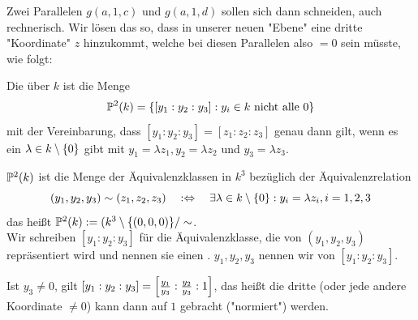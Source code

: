 Zwei Parallelen $g(a,1,c)$ und $g(a,1,d)$ sollen sich dann schneiden, auch rechnerisch. Wir lösen das so, dass in unserer neuen "Ebene" eine dritte "Koordinate" $z$ hinzukommt, welche bei diesen Parallelen also $=0$ sein müsste, wie folgt:

\begin{defn}
	Die  über $k$ ist die Menge
	\[ \PP^2(k) = \{ [y_1 : y_2 : y_3] : y_i \in k \text{ nicht alle } 0\}\]
	mit der Vereinbarung, dass $[y_1 : y_2 : y_3] = [z_1 : z_2 : z_3]$ genau dann gilt, wenn es ein $\lambda \in k \setminus \setnull$ gibt mit $y_1 = \lambda z_1, y_2 = \lambda z_2$ und $y_3 = \lambda z_3$.
\end{defn}

\begin{defn}
	$\PP^2(k)$ ist die Menge der Äquivalenzklassen in $k^3$ bezüglich der Äquivalenzrelation
	\[ (y_1,y_2,y_3) \sim (z_1,z_2,z_3) \quad :\Leftrightarrow \quad \exists \lambda \in k \setminus \setnull : y_i = \lambda z_i, i = 1, 2, 3 \]
	das heißt $\PP^2(k) := (k^3 \setminus \{(0,0,0)\} / \sim$. \\
	Wir schreiben $[y_1 : y_2 : y_3]$ für die Äquivalenzklasse, die von $(y_1,y_2,y_3)$ repräsentiert wird und nennen sie einen . $y_1,y_2,y_3$ nennen wir  von $[y_1: y_2 : y_3]$.
\end{defn}

\begin{bem}
	Ist $y_3 \neq 0$, gilt $[y_1 : y_2 : y_3] = \benbrace*{\frac{y_1}{y_3} : \frac{y_2}{y_3} : 1}$, das heißt die dritte (oder jede andere Koordinate $\neq 0$) kann dann auf $1$ gebracht ("normiert") werden.
\end{bem}

